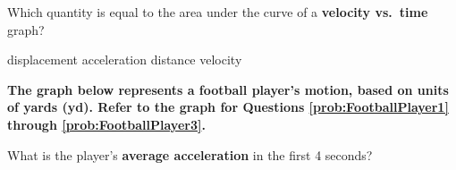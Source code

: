 \documentclass[addpoints]{exam}
\begin{document}
\begin{questions}















\question
Which quantity is equal to the area under the curve of a \textbf{velocity vs.~time} graph?
\begin{choices}
\correctchoice displacement
\choice acceleration
\choice distance
\choice velocity
\end{choices}




\clearpage
\begin{EnvUplevel}
\textbf{The graph below represents a football player's motion, based on units of yards (yd). Refer to the graph for Questions \ref{prob:FootballPlayer1} through \ref{prob:FootballPlayer3}.}
\end{EnvUplevel}

\begin{figure}[h!]
    \centering
    \label{fig:my_label}
\end{figure}

\question \label{prob:FootballPlayer1}
What is the player's \textbf{average acceleration} in the first 4 seconds?


\end{questions}
\end{document}

